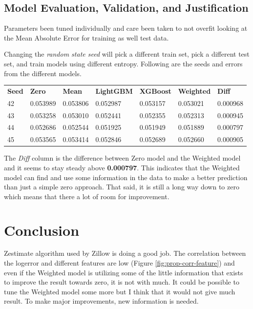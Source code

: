 \documentclass[a4paper]{article}
\begin{document}
\subsection{Model Evaluation, Validation, and Justification}


Parameters been tuned individually and care been taken to not overfit looking at the Mean Absolute Error for training as well test data.

Changing the \textit{random state seed} will pick a different train set, pick a different test set, and train models using different entropy. Following are the seeds and errors from the different models.
\begin{center}
\begin{tabular}{ l l l l l l l }
    \textbf{Seed} & \textbf{Zero} & \textbf{Mean} & \textbf{LightGBM} & \textbf{XGBoost} & \textbf{Weighted} & \textbf{Diff} \\
    42 & 0.053989 & 0.053806 & 0.052987 & 0.053157 & 0.053021 & 0.000968 \\
    43 & 0.053258 & 0.053010 & 0.052441 & 0.052355 & 0.052313 & 0.000945 \\
    44 & 0.052686 & 0.052544 & 0.051925 & 0.051949 & 0.051889 & 0.000797 \\
    45 & 0.053565 & 0.053414 & 0.052846 & 0.052689 & 0.052660 & 0.000905 \\
\end{tabular}
\end{center}
The \textit{Diff} column is the difference between Zero model and the Weighted model and it seems to stay steady above \textbf{0.000797}. This indicates that the Weighted model can find and use some information in the data to make a better prediction than just a simple zero approach. That said, it is still a long way down to zero which means that there a lot of room for improvement.

\section{Conclusion}
Zestimate algorithm used by Zillow is doing a good job. The correlation between the logerror and
different features are low (Figure \ref{fig:prop-corr-feature}) and even if the Weighted model is utilizing some of the little information that exists to improve the result towards zero, it is not with much. It could be possible to tune the Weighted model some more but I think that it would not give much result. To make major improvements, new information is needed.
\end{document}
